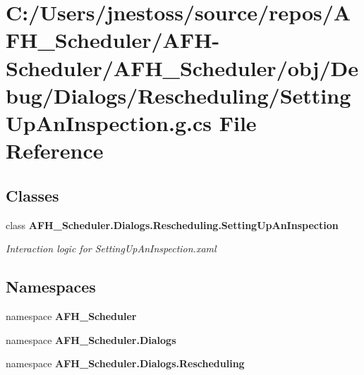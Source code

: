 \section{C\+:/\+Users/jnestoss/source/repos/\+A\+F\+H\+\_\+\+Scheduler/\+A\+F\+H-\/\+Scheduler/\+A\+F\+H\+\_\+\+Scheduler/obj/\+Debug/\+Dialogs/\+Rescheduling/\+Setting\+Up\+An\+Inspection.g.\+cs File Reference}
\label{_debug_2_dialogs_2_rescheduling_2_setting_up_an_inspection_8g_8cs}
\subsection*{Classes}
\begin{DoxyCompactItemize}
\item 
class \textbf{ A\+F\+H\+\_\+\+Scheduler.\+Dialogs.\+Rescheduling.\+Setting\+Up\+An\+Inspection}
\begin{DoxyCompactList}\small\item\em Interaction logic for Setting\+Up\+An\+Inspection.\+xaml \end{DoxyCompactList}\end{DoxyCompactItemize}
\subsection*{Namespaces}
\begin{DoxyCompactItemize}
\item 
namespace \textbf{ A\+F\+H\+\_\+\+Scheduler}
\item 
namespace \textbf{ A\+F\+H\+\_\+\+Scheduler.\+Dialogs}
\item 
namespace \textbf{ A\+F\+H\+\_\+\+Scheduler.\+Dialogs.\+Rescheduling}
\end{DoxyCompactItemize}
